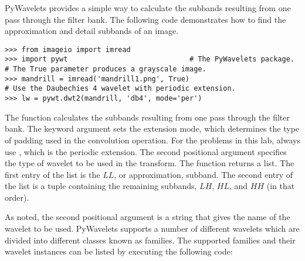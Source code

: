 \begin{comment}
The most recent version of PyWavelets can be installed using the Anaconda distribution with the following code:

\begin{lstlisting}
$ conda install -c ioos pywavelets=0.4.0
\end{lstlisting}
\end{comment}

PyWavelets provides a simple way to calculate the subbands resulting from one pass through the filter bank.
The following code demonstrates how to find the approximation and detail subbands of an image.

\begin{lstlisting}
>>> from imageio import imread
>>> import pywt                             # The PyWavelets package.
# The True parameter produces a grayscale image.
>>> mandrill = imread('mandrill1.png', True)
# Use the Daubechies 4 wavelet with periodic extension.
>>> lw = pywt.dwt2(mandrill, 'db4', mode='per')
\end{lstlisting}

The function  calculates the subbands resulting from one pass through the filter bank.
The  keyword argument sets the extension mode, which determines the type of padding used in the convolution operation.
For the problems in this lab, always use , which is the periodic extension.
The second positional argument specifies the type of wavelet to be used in the transform.
The function  returns a list.
The first entry of the list is the $LL$, or approximation, subband.
The second entry of the list is a tuple containing the remaining subbands, $LH$, $HL$, and $HH$ (in that order).
\begin{comment}
These subbands can be plotted as follows:

\begin{lstlisting}
>>> plt.subplot(221)
>>> plt.imshow(lw[0], cmap='gray')
>>> plt.axis('off')
>>> plt.subplot(222)
# The absolute value of the detail subbands is plotted to highlight contrast.
>>> plt.imshow(np.abs(lw[1][0]), cmap='gray')
>>> plt.axis('off')
>>> plt.subplot(223)
>>> plt.imshow(np.abs(lw[1][1]), cmap='gray')
>>> plt.axis('off')
>>> plt.subplot(224)
>>> plt.imshow(np.abs(lw[1][2]), cmap='gray')
>>> plt.axis('off')
>>> plt.subplots_adjust(wspace=0, hspace=0)      # Remove space between plots.
\end{lstlisting}
\end{comment}
As noted, the second positional argument is a string that gives the name of the wavelet to be used.
PyWavelets supports a number of different wavelets which are divided into different classes known as families.
The supported families and their wavelet instances can be listed by executing the following code:

